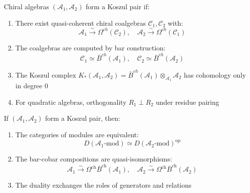 \begin{definition}
Chiral algebras $(\mathcal{A}_1, \mathcal{A}_2)$ form a Koszul pair if:
\begin{enumerate}
\item There exist quasi-coherent chiral coalgebras $\mathcal{C}_1, \mathcal{C}_2$ with:
   $$\mathcal{A}_1 \xrightarrow{\sim} \Omega^{ch}(\mathcal{C}_2), \quad \mathcal{A}_2 \xrightarrow{\sim} \Omega^{ch}(\mathcal{C}_1)$$
\item The coalgebras are computed by bar construction:
   $$\mathcal{C}_1 \simeq \bar{B}^{ch}(\mathcal{A}_1), \quad \mathcal{C}_2 \simeq \bar{B}^{ch}(\mathcal{A}_2)$$
\item The Koszul complex $K_*(\mathcal{A}_1, \mathcal{A}_2) = \bar{B}^{ch}(\mathcal{A}_1) \otimes_{\mathcal{A}_1} \mathcal{A}_2$
   has cohomology only in degree 0
\item For quadratic algebras, orthogonality $R_1 \perp R_2$ under residue pairing
\end{enumerate}
\end{definition}
 
\begin{theorem}\label{thm:koszul-main}
If $(\mathcal{A}_1, \mathcal{A}_2)$ form a Koszul pair, then:
\begin{enumerate}
\item The categories of modules are equivalent:
\[
D(\mathcal{A}_1\text{-mod}) \simeq D(\mathcal{A}_2\text{-mod})^{\text{op}}
\]
\item The bar-cobar compositions are quasi-isomorphisms:
\[
\mathcal{A}_1 \xrightarrow{\sim} \Omega^{\text{ch}}\bar{B}^{\text{ch}}(\mathcal{A}_1), \quad
\mathcal{A}_2 \xrightarrow{\sim} \Omega^{\text{ch}}\bar{B}^{\text{ch}}(\mathcal{A}_2)
\]
\item The duality exchanges the roles of generators and relations
\end{enumerate}
\end{theorem}
 

